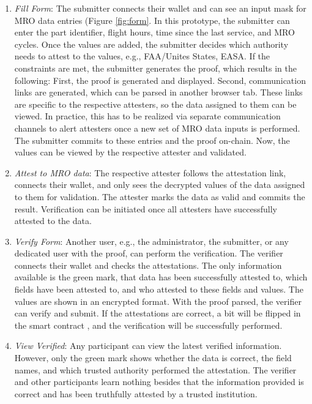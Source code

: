\begin{enumerate}
\item \textit{Fill Form}:
The submitter connects their wallet and can see an input mask for MRO data entries (Figure \ref{fig:form}. In this prototype, the submitter can enter the part identifier, flight hours, time since the last service, and MRO cycles. Once the values are added, the submitter decides which authority needs to attest to the values, e.g., FAA/Unites States, EASA. If the constraints are met, the submitter generates the proof, which results in the following: First, the proof is generated and displayed. Second, communication links are generated, which can be parsed in another browser tab. These links are specific to the respective attesters, so the data assigned to them can be viewed. In practice, this has to be realized via separate communication channels to alert attesters once a new set of MRO data inputs is performed. The submitter commits to these entries and the proof on-chain. Now, the values can be viewed by the respective attester and validated.

\item \textit{Attest to MRO data}: The respective attester follows the attestation link, connects their wallet, and only sees the decrypted values of the data assigned to them for validation. The attester marks the data as valid and commits the result. Verification can be initiated once all attesters have successfully attested to the data.

\item \textit{Verify Form}: Another user, e.g., the administrator, the submitter, or any dedicated user with the proof, can perform the verification. The verifier connects their wallet and checks the attestations. The only information available is the green mark, that data has been successfully attested to, which fields have been attested to, and who attested to these fields and values. The values are shown in an encrypted format. With the proof parsed, the verifier can verify and submit. If the attestations are correct, a bit will be flipped in the smart contract \citep{zkdocs}, and the verification will be successfully performed.

\item \textit{View Verified}: Any participant can view the latest verified information. However, only the green mark shows whether the data is correct, the field names, and which trusted authority performed the attestation. The verifier and other participants learn nothing besides that the information provided is correct and has been truthfully attested by a trusted institution.
\end{enumerate}


